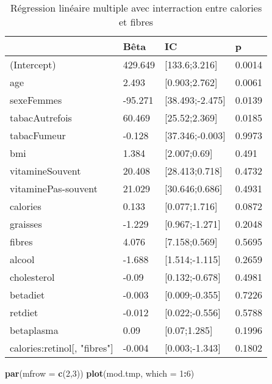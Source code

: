 \documentclass[]{article}
\newenvironment{Shaded}{\begin{snugshade}}{\end{snugshade}}
\newcommand{\KeywordTok}[1]{\textcolor[rgb]{0.13,0.29,0.53}{\textbf{#1}}}
\newcommand{\DataTypeTok}[1]{\textcolor[rgb]{0.13,0.29,0.53}{#1}}
\newcommand{\DecValTok}[1]{\textcolor[rgb]{0.00,0.00,0.81}{#1}}
\newcommand{\OperatorTok}[1]{\textcolor[rgb]{0.81,0.36,0.00}{\textbf{#1}}}
\newcommand{\NormalTok}[1]{#1}
\begin{document}
\begin{table}

\caption{\label{tab:unnamed-chunk-74}Régression linéaire multiple avec interraction entre calories et fibres}
\centering
\begin{tabular}[t]{l|l|l|l}
\hline
  & Bêta & IC & p\\
\hline
\rowcolor[HTML]{BBD2E1}  (Intercept) & 429.649 & [133.6;3.216] & 0.0014\\
\hline
age & 2.493 & [0.903;2.762] & 0.0061\\
\hline
\rowcolor[HTML]{BBD2E1}  sexeFemmes & -95.271 & [38.493;-2.475] & 0.0139\\
\hline
tabacAutrefois & 60.469 & [25.52;2.369] & 0.0185\\
\hline
\rowcolor[HTML]{BBD2E1}  tabacFumeur & -0.128 & [37.346;-0.003] & 0.9973\\
\hline
bmi & 1.384 & [2.007;0.69] & 0.491\\
\hline
\rowcolor[HTML]{BBD2E1}  vitamineSouvent & 20.408 & [28.413;0.718] & 0.4732\\
\hline
vitaminePas-souvent & 21.029 & [30.646;0.686] & 0.4931\\
\hline
\rowcolor[HTML]{BBD2E1}  calories & 0.133 & [0.077;1.716] & 0.0872\\
\hline
graisses & -1.229 & [0.967;-1.271] & 0.2048\\
\hline
\rowcolor[HTML]{BBD2E1}  fibres & 4.076 & [7.158;0.569] & 0.5695\\
\hline
alcool & -1.688 & [1.514;-1.115] & 0.2659\\
\hline
\rowcolor[HTML]{BBD2E1}  cholesterol & -0.09 & [0.132;-0.678] & 0.4981\\
\hline
betadiet & -0.003 & [0.009;-0.355] & 0.7226\\
\hline
\rowcolor[HTML]{BBD2E1}  retdiet & -0.012 & [0.022;-0.556] & 0.5788\\
\hline
betaplasma & 0.09 & [0.07;1.285] & 0.1996\\
\hline
\rowcolor[HTML]{BBD2E1}  calories:retinol[, "fibres"] & -0.004 & [0.003;-1.343] & 0.1802\\
\hline
\end{tabular}
\end{table}

\begin{Shaded}
\begin{Highlighting}[]
\KeywordTok{par}\NormalTok{(}\DataTypeTok{mfrow =} \KeywordTok{c}\NormalTok{(}\DecValTok{2}\NormalTok{,}\DecValTok{3}\NormalTok{))}
\KeywordTok{plot}\NormalTok{(mod.tmp, }\DataTypeTok{which =} \DecValTok{1}\OperatorTok{:}\DecValTok{6}\NormalTok{)}
\end{Highlighting}
\end{Shaded}
\end{document}
